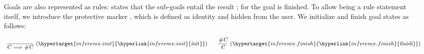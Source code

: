 \begin{isabellebody}
\begin{isamarkuptext}
  \medskip Goals are also represented as rules:  states that the sub-goals  entail the result ; for  the
  goal is finished.  To allow  being a rule statement
  itself, we introduce the protective marker , which is defined as identity and hidden from the user.  We
  initialize and finish goal states as follows:

  \[
  \begin{array}{c@ {\qquad}c}
  \infer[(\indexdef{}{inference}{init}\hypertarget{inference.init}{\hyperlink{inference.init}{\mbox{\isa{init}}}})]{\isa{{\isaliteral{22}{\isachardoublequote}}C\ {\isaliteral{5C3C4C6F6E6772696768746172726F773E}{\isasymLongrightarrow}}\ {\isaliteral{23}{\isacharhash}}C{\isaliteral{22}{\isachardoublequote}}}}{} &
  \infer[(\indexdef{}{inference}{finish}\hypertarget{inference.finish}{\hyperlink{inference.finish}{\mbox{\isa{finish}}}})]{\isa{C}}{\isa{{\isaliteral{22}{\isachardoublequote}}{\isaliteral{23}{\isacharhash}}C{\isaliteral{22}{\isachardoublequote}}}}
  \end{array}
  \]


\end{isamarkuptext}
\end{isabellebody}
